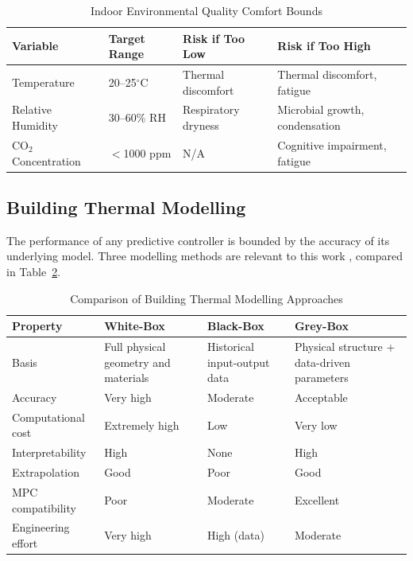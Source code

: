\documentclass[12pt, a4paper]{article}
\begin{document}
	\begin{table}[h]
		\centering
		\caption{Indoor Environmental Quality Comfort Bounds}
		\label{tab:iaq_bounds}
		\begin{tabular}{llll}
			\toprule
			\textbf{Variable} & \textbf{Target Range} & \textbf{Risk if Too Low} & \textbf{Risk if Too High} \\
			\midrule
			Temperature  & 20--25$^\circ$C & Thermal discomfort & Thermal discomfort, fatigue \\
			Relative Humidity & 30--60\% RH & Respiratory dryness & Microbial growth, condensation \\
			CO$_2$ Concentration & $<$1000 ppm & N/A & Cognitive impairment, fatigue \\
			\bottomrule
		\end{tabular}
	\end{table}
	
	
	\subsection{Building Thermal Modelling}
	
	The performance of any predictive controller is bounded by the accuracy of its underlying model. Three modelling methods are relevant to this work \citep{aframTheoryApplicationsHVAC2014, balaliEnergyModellingControl2023}, compared in Table~\ref{tab:modelling_paradigms}.
	
	\begin{table}[h]
		\centering
		\caption{Comparison of Building Thermal Modelling Approaches}
		\label{tab:modelling_paradigms}
		\begin{tabular}{lp{3.5cm}p{3.5cm}p{3.5cm}}
			\toprule
			\textbf{Property} & \textbf{White-Box} & \textbf{Black-Box} & \textbf{Grey-Box } \\
			\midrule
			Basis & Full physical geometry and materials & Historical input-output data & Physical structure + data-driven parameters \\
			Accuracy & Very high & Moderate & Acceptable \\
			Computational cost & Extremely high & Low & Very low \\
			Interpretability & High & None & High \\
			Extrapolation & Good & Poor & Good \\
			MPC compatibility & Poor & Moderate & Excellent \\
			Engineering effort & Very high & High (data) & Moderate \\
			\bottomrule
		\end{tabular}
	\end{table}
	
\end{document}
